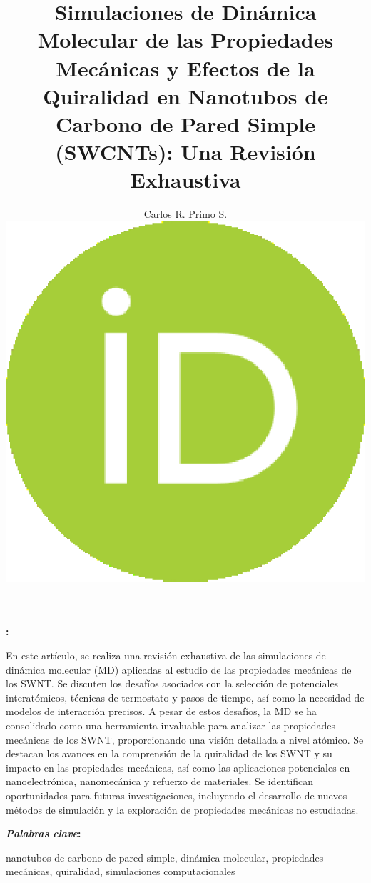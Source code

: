 \documentclass[a4paper]{article}
\title{Simulaciones de Dinámica Molecular de las Propiedades Mecánicas y Efectos de la Quiralidad en Nanotubos de Carbono de Pared Simple (SWCNTs): Una Revisión Exhaustiva} %
\author{Carlos R. Primo S.\href{https://orcid.org/0000-0000-0000-0000}{\includegraphics[scale=0.04]{orcidicon.eps}} } %
\affil{Universidad Mayor de San Marcos, Facultad de Ciencias Fisicas, Lima, Peru }
\date{}
\newcommand{\abstractinenglishname}{Abstract}
\newcommand{\keywordsportugues}{Palabras clave}
\renewenvironment{abstract}{%
        \begin{center}
	\begin{minipage}{14cm}
	{\textbf{\abstractname:}}
}{
        \end{minipage}
	\end{center}
}
\newenvironment{abstractinenglish}{
        \def\abstractname{\abstractinenglishname}
	\begin{abstract}
}{
        \end{abstract}
}
\newenvironment{keywords}{
        \def\abstractname{\emph{\keywordsportugues}}
	\begin{abstract}
}{
        \end{abstract}
}
\begin{document}
\maketitle
\vspace{6pt}

\begin{abstract}
En este artículo, se realiza una revisión exhaustiva de las simulaciones de dinámica molecular (MD) aplicadas al estudio de las propiedades mecánicas de los SWNT. Se discuten los desafíos asociados con la selección de potenciales interatómicos, técnicas de termostato y pasos de tiempo, así como la necesidad de modelos de interacción precisos. A pesar de estos desafíos, la MD se ha consolidado como una herramienta invaluable para analizar las propiedades mecánicas de los SWNT, proporcionando una visión detallada a nivel atómico. Se destacan los avances en la comprensión de la quiralidad de los SWNT y su impacto en las propiedades mecánicas, así como las aplicaciones potenciales en nanoelectrónica, nanomecánica y refuerzo de materiales. Se identifican oportunidades para futuras investigaciones, incluyendo el desarrollo de nuevos métodos de simulación y la exploración de propiedades mecánicas no estudiadas. 
\end{abstract}

\begin{keywords}
nanotubos de carbono de pared simple, dinámica molecular, propiedades mecánicas, quiralidad, simulaciones computacionales
\end{keywords}


\end{document}
